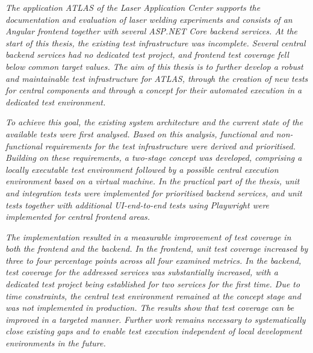 \textit{The application \ac{ATLAS} of the Laser Application Center supports the documentation and evaluation of laser welding experiments and consists of an Angular frontend together with several ASP.NET Core backend services. At the start of this thesis, the existing test infrastructure was incomplete. Several central backend services had no dedicated test project, and frontend test coverage fell below common target values. The aim of this thesis is to further develop a robust and maintainable test infrastructure for \ac{ATLAS}, through the creation of new tests for central components and through a concept for their automated execution in a dedicated test environment.}

\textit{To achieve this goal, the existing system architecture and the current state of the available tests were first analysed. Based on this analysis, functional and non-functional requirements for the test infrastructure were derived and prioritised. Building on these requirements, a two-stage concept was developed, comprising a locally executable test environment followed by a possible central execution environment based on a virtual machine. In the practical part of the thesis, unit and integration tests were implemented for prioritised backend services, and unit tests together with additional UI-end-to-end tests using Playwright were implemented for central frontend areas.}

\textit{The implementation resulted in a measurable improvement of test coverage in both the frontend and the backend. In the frontend, unit test coverage increased by three to four percentage points across all four examined metrics. In the backend, test coverage for the addressed services was substantially increased, with a dedicated test project being established for two services for the first time. Due to time constraints, the central test environment remained at the concept stage and was not implemented in production. The results show that test coverage can be improved in a targeted manner. Further work remains necessary to systematically close existing gaps and to enable test execution independent of local development environments in the future.}